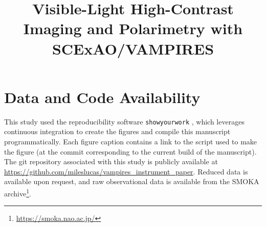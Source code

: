 \documentclass[linenumbers,twocolumn]{aastex631}
\begin{document}
\title{Visible-Light High-Contrast Imaging and Polarimetry with SCExAO/VAMPIRES}




% 


% 














\appendix






\section{Data and Code Availability}
This study used the reproducibility software \texttt{showyourwork} \citep{luger_mapping_2021}, which leverages continuous integration to create the figures and compile this manuscript programmatically. Each figure caption contains a link to the script used to make the figure (at the commit corresponding to the current build of the manuscript). The git repository associated with this study is publicly available at \url{https://github.com/mileslucas/vampires_instrument_paper}. Reduced data is available upon request, and raw observational data is available from the SMOKA archive\footnote{\url{https://smoka.nao.ac.jp/}}.
\end{document}
